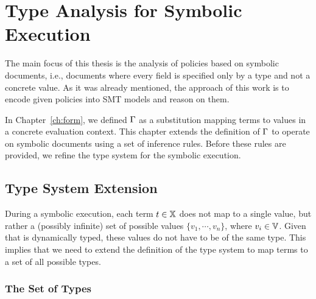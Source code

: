 \chapter{Type Analysis for Symbolic Execution}
\label{ch:typ}

The main focus of this thesis is the analysis of \rego policies based on symbolic documents, i.e., documents where every field is specified only by a type and not a concrete value.
As it was already mentioned, the approach of this work is to encode given policies into SMT models and reason on them.

In Chapter~\ref{ch:form}, we defined $\Gamma$ as a substitution mapping terms to values in a concrete evaluation context.
This chapter extends the definition of $\Gamma$ to operate on symbolic documents using a set of inference rules.
Before these rules are provided, we refine the type system for the symbolic execution.


\section{Type System Extension}

During a symbolic execution, each term $t \in \mathbb{X}$ does not map to a single value, but rather a (possibly infinite) set of possible values $\{v_1,\cdots,v_n\}$, where $v_i \in \mathbb{V}$.
Given that \rego is dynamically typed, these values do not have to be of the same type.
This implies that we need to extend the definition of the type system to map terms to a set of all possible types.

\subsection{The Set of Types}
\label{ss:types:new}

